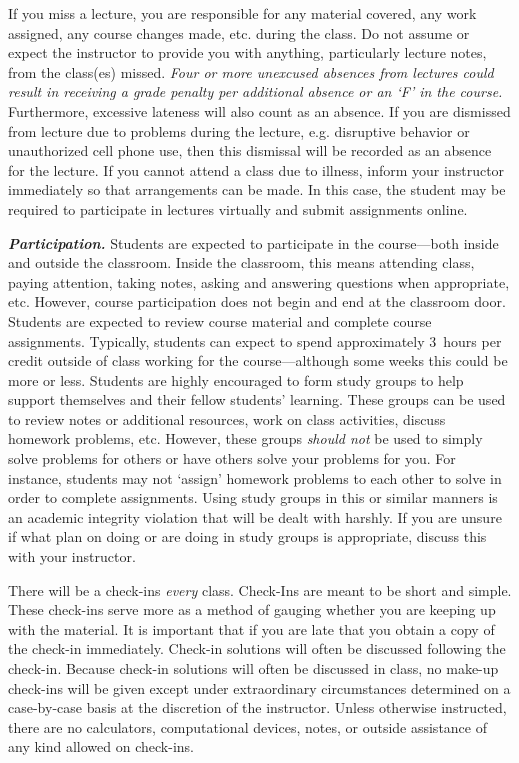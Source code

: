 \documentclass[11pt,letterpaper]{article}
\begin{document}
If you miss a lecture, you are responsible for any material covered, any work assigned, any course changes made, etc. during the class. Do not assume or expect the instructor to provide you with anything, particularly lecture notes, from the class(es) missed. {\itshape Four or more unexcused absences from lectures could result in receiving a grade penalty per additional absence or an `F' in the course.} Furthermore, excessive lateness will also count as an absence. If you are dismissed from lecture due to problems during the lecture, e.g. disruptive behavior or unauthorized cell phone use, then this dismissal will be recorded as an absence for the lecture. If you cannot attend a class due to illness, inform your instructor immediately so that arrangements can be made. In this case, the student may be required to participate in lectures virtually and submit assignments online. \pspace

{\itshape\bfseries\color{scred}Participation.} 
Students are expected to participate in the course---both inside and outside the classroom. Inside the classroom, this means attending class, paying attention, taking notes, asking and answering questions when appropriate, etc. However, course participation does not begin and end at the classroom door. Students are expected to review course material and complete course assignments. Typically, students can expect to spend approximately 3~hours per credit outside of class working for the course---although some weeks this could be more or less. Students are highly encouraged to form study groups to help support themselves and their fellow students' learning. These groups can be used to review notes or additional resources, work on class activities, discuss homework problems, etc. However, these groups {\itshape should not} be used to simply solve problems for others or have others solve your problems for you. For instance, students may not `assign' homework problems to each other to solve in order to complete assignments. Using study groups in this or similar manners is an academic integrity violation that will be dealt with harshly. If you are unsure if what plan on doing or are doing in study groups is appropriate, discuss this with your instructor. \par\vspace{0.8cm}




There will be a check-ins \textit{every} class. Check-Ins are meant to be short and simple. These check-ins serve more as a method of gauging whether you are keeping up with the material. It is important that if you are late that you obtain a copy of the check-in immediately. Check-in solutions will often be discussed following the check-in. Because check-in solutions will often be discussed in class, no make-up check-ins will be given except under extraordinary circumstances determined on a case-by-case basis at the discretion of the instructor. Unless otherwise instructed, there are no calculators, computational devices, notes, or outside assistance of any kind allowed on check-ins. 
\sectionbreak
\end{document}
